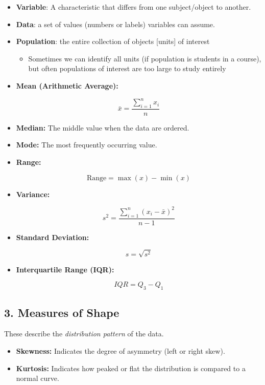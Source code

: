 \documentclass[
  letterpaper,
  DIV=11,
  numbers=noendperiod]{scrreprt}
\providecommand{\tightlist}{%
  \setlength{\itemsep}{0pt}\setlength{\parskip}{0pt}}
\begin{document}
\begin{itemize}
\item
  \textbf{Variable}: A characteristic that differs from one
  subject/object to another.
\item
  \textbf{Data}: a set of values (numbers or labels) variables can
  assume.
\item
  \textbf{Population}: the entire collection of objects {[}units{]} of
  interest

  \begin{itemize}
  \tightlist
  \item
    Sometimes we can identify all units (if population is students in a
    course), but often populations of interest are too large to study
    entirely
  \end{itemize}
\item
  \textbf{Mean (Arithmetic Average):}

  \[
  \bar{x} = \frac{\sum_{i=1}^{n} x_i}{n}
  \]
\item
  \textbf{Median:} The middle value when the data are ordered.
\item
  \textbf{Mode:} The most frequently occurring value.
\item
  \textbf{Range:}

  \[
  \text{Range} = \max(x) - \min(x)
  \]
\item
  \textbf{Variance:}

  \[
  s^2 = \frac{\sum_{i=1}^{n} (x_i - \bar{x})^2}{n - 1}
  \]
\item
  \textbf{Standard Deviation:}

  \[
  s = \sqrt{s^2}
  \]
\item
  \textbf{Interquartile Range (IQR):}

  \[
  IQR = Q_3 - Q_1
  \]
\end{itemize}

\subsection{3. Measures of Shape}\label{measures-of-shape}

These describe the \emph{distribution pattern} of the data.

\begin{itemize}
\item
  \textbf{Skewness:} Indicates the degree of asymmetry (left or right
  skew).
\item
  \textbf{Kurtosis:} Indicates how peaked or flat the distribution is
  compared to a normal curve.
\end{itemize}
\end{document}
